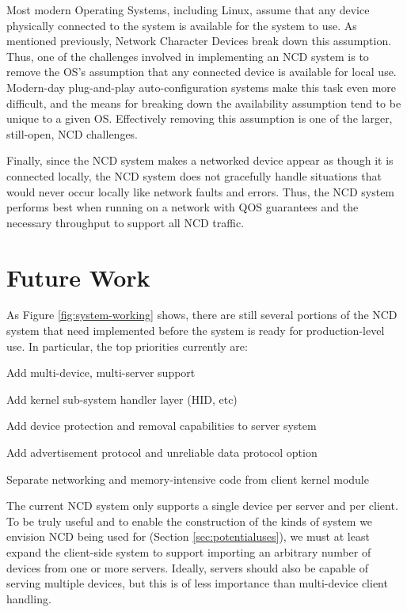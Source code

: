 \documentclass[11pt,twocolumn]{article}
\newenvironment{packed_item}{
\begin{itemize}
  \setlength{\itemsep}{1pt}
  \setlength{\parskip}{0pt}
  \setlength{\parsep}{0pt}
}{\end{itemize}}
\begin{document}
Most modern Operating Systems, including Linux, assume that any device
physically connected to the system is available for the system to
use. As mentioned previously, Network Character Devices break down this
assumption. Thus, one of the challenges involved in implementing an NCD
system is to remove the OS's assumption that any connected device is
available for local use. Modern-day plug-and-play auto-configuration
systems make this task even more difficult, and the means for breaking
down the availability assumption tend to be unique to a given
OS. Effectively removing this assumption is one of the larger,
still-open, NCD challenges.

Finally, since the NCD system makes a networked device appear as
though it is connected locally, the NCD system does not gracefully
handle situations that would never occur locally like network faults
and errors. Thus, the NCD system performs best when running on a
network with QOS guarantees and the necessary throughput to support all
NCD traffic.

\section{Future Work}
\label{sec:futurework}

As Figure \ref{fig:system-working} shows, there are still several
portions of the NCD system that need implemented before the system is
ready for production-level use. In particular, the top priorities
currently are:

\begin{packed_item}
\item Add multi-device, multi-server support
\item Add kernel sub-system handler layer (HID, etc)
\item Add device protection and removal capabilities to server system
\item Add advertisement protocol and unreliable data protocol option
\item Separate networking and memory-intensive code from client kernel module
\end{packed_item}

The current NCD system only supports a single device per server and per
client. To be truly useful and to enable the construction of the
kinds of system we envision NCD being used for (Section
\ref{sec:potentialuses}), we must at least
expand the client-side
system to support importing an arbitrary number of devices from one
or more servers. Ideally, servers should also be capable of serving
multiple devices, but this is of less importance than multi-device
client handling.
\end{document}
